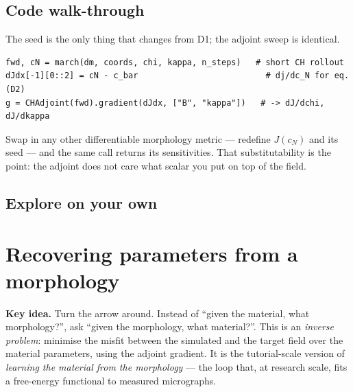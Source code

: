 \section{Code walk-through}

The seed is the only thing that changes from D1; the adjoint sweep is
identical.
\begin{lstlisting}
fwd, cN = march(dm, coords, chi, kappa, n_steps)   # short CH rollout
dJdx[-1][0::2] = cN - c_bar                          # dj/dc_N for eq. (D2)
g = CHAdjoint(fwd).gradient(dJdx, ["B", "kappa"])   # -> dJ/dchi, dJ/dkappa
\end{lstlisting}
Swap in any other differentiable morphology metric --- redefine $J(c_N)$
and its seed --- and the same call returns its sensitivities. That
substitutability is the point: the adjoint does not care what scalar you
put on top of the field.

\section{Explore on your own}



\chapter{Recovering parameters from a morphology}
\label{ch:d3}

\begin{keybox}
\textbf{Key idea.} Turn the arrow around. Instead of ``given the
material, what morphology?'', ask ``given the morphology, what
material?''. This is an \emph{inverse problem}: minimise the misfit
between the simulated and the target field over the material parameters,
using the adjoint gradient. It is the tutorial-scale version of
\emph{learning the material from the morphology} --- the loop that, at
research scale, fits a free-energy functional to measured micrographs.
\end{keybox}

